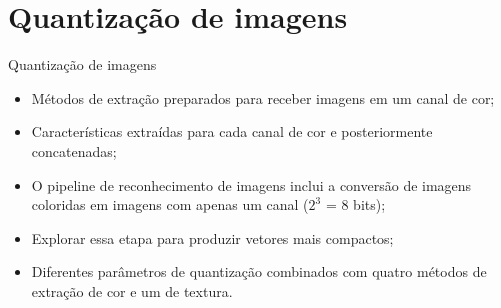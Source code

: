 \documentclass{beamer}
\begin{document}
\section{Quantização de imagens}
\begin{frame}{Quantização de imagens}
  \setlength\leftmargini{1em}
  \begin{block}{}
    \justifying
    \begin{itemize}
      \item Métodos de extração preparados para receber imagens em um canal de cor;
      \item Características extraídas para cada canal de cor e posteriormente concatenadas;
      \item O pipeline de reconhecimento de imagens inclui a conversão de imagens coloridas em imagens com apenas um canal ($2^3$ = 8 bits);
      \item Explorar essa etapa para produzir vetores mais compactos;
      \item Diferentes parâmetros de quantização combinados com quatro métodos de extração de cor e um de textura.
    \end{itemize}
  \end{block}
\end{frame}
\end{document}
